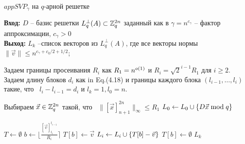 \documentclass[a4paper,11pt]{article}
\begin{document}
\begin{algorithm}[t]
	\caption{$appSVP_{\gamma}$ на $q$-арной решетке}
	\textbf{Вход:} $D$ -- базис решетки $L^{\perp}_q (A) \subset {{\mathbb Z}}_q^{2n}$ заданный как в  $\gamma = n^{c_{\gamma}}$ -- фактор аппроксимации, $c_{\gamma}>0$ \\
	\textbf{Выход:} $L_k$ --список векторов из $L^{\perp}_q (A)$, где все векторы нормы $\| \vec{v} \| \leq n^{c_{\gamma}+c_q/2+1/2}$;
	
	\begin{algorithmic}[1]
		
		\State Задаем границы просеивания $R_i$ как $R_1 = n^{o(1)}$ и $R_i = \sqrt{2}^{i-1} R_1$ для $i \geq 2$.
		\State Задаем длину блоков $d_i$ как in Eq.(4.18) и границы каждого блока $(l_{i-1}, \ldots, l_i)$ такие, что \ $l_{i}-{l_{i-1}} = d_i$ и $l_k = 1, l_0 = n$.
		
		\Repeat {}
		\State Выбираем $\vec{x} \in {{\mathbb Z}}_q^{2n}$ такой, что \ $\| [\vec{x}]_{n+1}^{2n} \|_{\infty} \leq R_1$
		\State $L_0 \gets L_0 \mathbin{\cup} \{D\vec{x} \bmod q\} $
		
		\State $T \gets \emptyset$ 
				\State $b \gets \Big\lfloor \frac{[\vec{v}]_{l_i}^{l_{i-1}}}{R_i} \Big\rceil$ 
					\State $T[b] \gets \vec{v}$
				\Else
					\State $L_{i} \gets L_{i} \mathbin{\cup} \{T[b] - \vec{v} \}$
					\State $T[b] \gets \emptyset$
				\EndIf
			\EndFor
		\EndFor
		\State \Return $L_k$
	\end{algorithmic}
	
	\vspace{10pt}
	
\end{algorithm}
\end{document}
